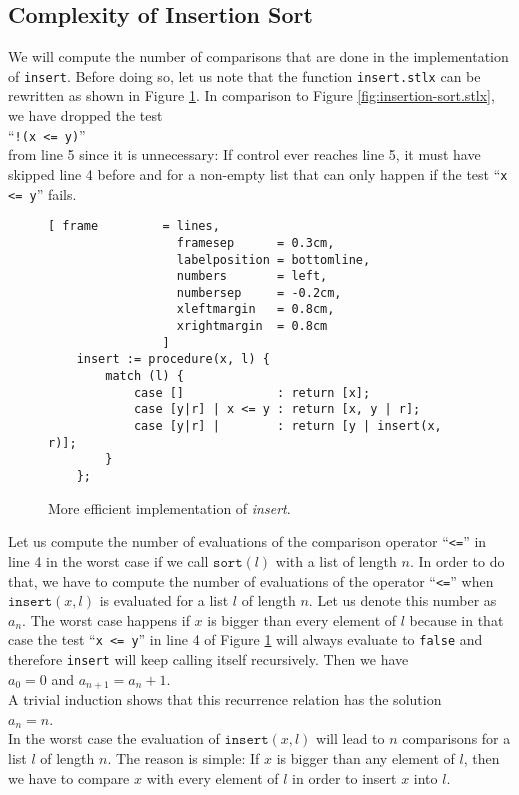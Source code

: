 \subsection{Complexity of Insertion Sort}
We will compute the number of comparisons that are done in the implementation of \texttt{insert}.
Before doing so, let us note that the function \texttt{insert.stlx} can be rewritten as shown in Figure
\ref{fig:insert.stlx}.  In comparison to Figure \ref{fig:insertion-sort.stlx}, we have dropped the
test
\\[0.2cm]
\hspace*{1.3cm}
``\texttt{!(x <= y)}'' 
\\[0.2cm]
from line 5 since it is unnecessary:  If control ever reaches line 5, it must
have skipped line 4 before and for a non-empty list that can only happen if the test 
``\texttt{x <= y}'' fails.
\begin{figure}[!ht]
  \centering
\begin{Verbatim}[ frame         = lines, 
                  framesep      = 0.3cm, 
                  labelposition = bottomline,
                  numbers       = left,
                  numbersep     = -0.2cm,
                  xleftmargin   = 0.8cm,
                  xrightmargin  = 0.8cm
                ]
    insert := procedure(x, l) {
        match (l) {
            case []             : return [x];
            case [y|r] | x <= y : return [x, y | r];
            case [y|r] |        : return [y | insert(x, r)];
        }
    };
\end{Verbatim}
\vspace*{-0.3cm}
  \caption{More efficient implementation of \emph{insert}.}
  \label{fig:insert.stlx}
\end{figure} 

Let us compute the number of evaluations of the comparison operator ``\texttt{<=}'' in line 4 in the
worst case if we call $\texttt{sort}(l)$ with a list of length $n$. In order to do that, we have to
compute the number of evaluations of the operator ``\texttt{<=}'' when 
 $\texttt{insert}(x,l)$ is evaluated for a list $l$ of length $n$.  Let us denote this number as 
$a_n$.  The worst case happens if $x$ is bigger than every element of $l$ because in that case the
test ``\texttt{x <= y}'' in line 4 of Figure \ref{fig:insert.stlx} will always evaluate to
\texttt{false} and therefore \texttt{insert} will keep calling itself recursively.
Then we have
\\[0.2cm]
\hspace*{1.3cm}
$a_0 = 0$ \quad and \quad $a_{n+1} = a_n + 1$. 
\\[0.2cm]
A trivial induction shows that this recurrence relation has the solution
\\[0.2cm]
\hspace*{1.3cm} 
$a_n = n$.
\\[0.2cm]
In the worst case the evaluation of $\mathtt{insert}(x,l)$ will lead to $n$ comparisons for a list
$l$ of length $n$.  The reason is simple:  If $x$ is bigger than any element of $l$, then we have to
compare $x$ with every element of $l$ in order to insert $x$ into $l$.

